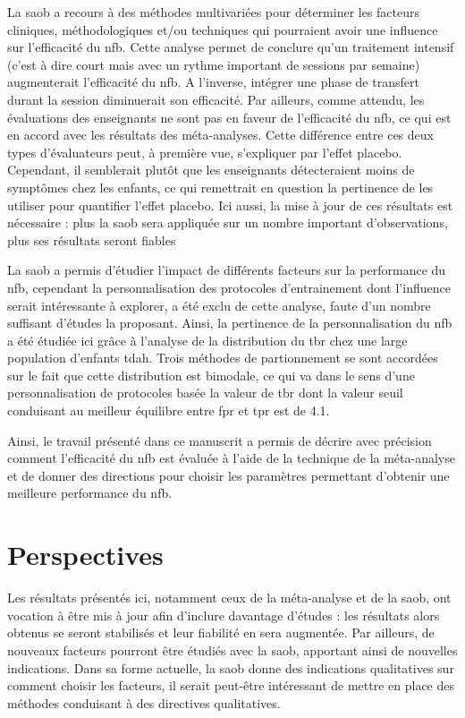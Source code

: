 La \gls{saob} a recours à des méthodes multivariées pour déterminer les facteurs cliniques, méthodologiques et/ou techniques qui pourraient avoir une influence sur l'efficacité du \gls{nfb}. 
Cette analyse permet de conclure qu'un traitement intensif (c'est à dire court mais avec un rythme important de sessions par semaine) augmenterait l'efficacité du \gls{nfb}. A l'inverse,  
intégrer une phase de transfert durant la session diminuerait son efficacité. Par ailleurs, comme attendu, les évaluations des enseignants ne sont pas en faveur de l'efficacité du \gls{nfb}, 
ce qui est en accord avec les résultats des méta-analyses. Cette différence entre ces deux types d'évaluateurs 
peut, à première vue, s'expliquer par l'effet placebo. Cependant, il semblerait plutôt que les enseignants détecteraient moins de symptômes chez les enfants, ce qui remettrait en question la
pertinence de les utiliser pour quantifier l'effet placebo. Ici aussi, la mise à jour de ces résultats est nécessaire : plus la \gls{saob} sera appliquée sur un nombre important d'observations,
plus ses résultats seront fiables

La \gls{saob} a permis d'étudier l'impact de différents facteurs sur la performance du \gls{nfb}, cependant la personnalisation des protocoles d'entrainement dont l'influence serait intéressante 
à explorer, a été exclu de cette analyse, faute d'un nombre suffisant d'études la proposant. Ainsi, la pertinence de la personnalisation du \gls{nfb} a été étudiée ici grâce à l'analyse de la distribution 
du \gls{tbr} chez une large population d'enfants \gls{tdah}. Trois méthodes de partionnement se sont accordées sur le fait que cette distribution est bimodale, ce qui va dans 
le sens d'une personnalisation de protocoles basée la valeur de \gls{tbr} dont la valeur seuil conduisant au meilleur équilibre entre \gls{fpr} et \gls{tpr} est de 4.1. 

Ainsi, le travail présenté dans ce manuscrit a permis de décrire avec précision comment l'efficacité du \gls{nfb} est évaluée à l'aide de la technique de la méta-analyse et de donner des 
directions pour choisir les paramètres permettant d'obtenir une meilleure performance du \gls{nfb}.


\section{Perspectives}

Les résultats présentés ici, notamment ceux de la méta-analyse et de la \gls{saob}, ont vocation à être mis à jour afin d'inclure davantage d'études : les résultats alors obtenus se 
seront stabilisés et leur fiabilité en sera augmentée. Par ailleurs, de nouveaux facteurs pourront être étudiés avec la \gls{saob}, apportant ainsi de nouvelles  
indications. Dans sa forme actuelle, la \gls{saob} donne des indications qualitatives sur comment choisir les facteurs, il serait peut-être intéressant de mettre en place des
méthodes conduisant à des directives qualitatives.

